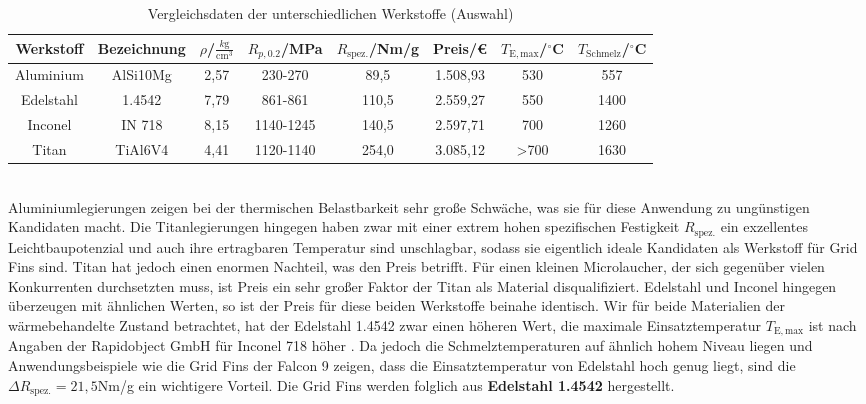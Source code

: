 \begin{table}[h] 
	\centering 
	\begin{tabular}{c|c|c|c|c|c|c|c} 
		Werkstoff&Bezeichnung&$\rho$/$\frac{k\mathrm{g}}{\mathrm{cm}^3}$&$R_{p,0.2}$/MPa&$R_\mathrm{spez.}$/Nm/g&Preis/€&$T_\mathrm{E, max}$/$^\circ$C&$T_\mathrm{Schmelz}$/$^\circ$C\\ 
		\hline 
		Aluminium&AlSi10Mg&2,57&230-270&89,5&1.508,93&530&557\\ 
		Edelstahl&1.4542&7,79&861-861&110,5&2.559,27&550&1400\\ 
		Inconel&IN 718&8,15&1140-1245&140,5&2.597,71&700&1260\\ 
		Titan&TiAl6V4&4,41&1120-1140&254,0&3.085,12&>700&1630\\ 
	\end{tabular} 
	\begin{flushright} 
	\end{flushright} 
	\caption{Vergleichsdaten der unterschiedlichen Werkstoffe (Auswahl)}
	\label{tab_WerkstoffeKlein}
\end{table} \\
Aluminiumlegierungen zeigen bei der thermischen Belastbarkeit sehr große Schwäche, was sie für diese Anwendung zu ungünstigen Kandidaten macht. Die Titanlegierungen hingegen haben zwar mit einer extrem hohen spezifischen Festigkeit $R_\mathrm{spez.}$ ein exzellentes Leichtbaupotenzial und auch ihre ertragbaren Temperatur sind unschlagbar, sodass sie eigentlich ideale Kandidaten als Werkstoff für Grid Fins sind. Titan hat jedoch einen enormen Nachteil, was den Preis betrifft. Für einen kleinen Microlaucher, der sich gegenüber vielen Konkurrenten durchsetzten muss, ist Preis ein sehr großer Faktor der Titan als Material disqualifiziert. Edelstahl und Inconel hingegen überzeugen mit ähnlichen Werten, so ist der Preis für diese beiden Werkstoffe beinahe identisch. Wir für beide Materialien der wärmebehandelte Zustand betrachtet, hat der Edelstahl 1.4542 zwar einen höheren Wert, die maximale Einsatztemperatur $T_\mathrm{E, max}$ ist nach Angaben der Rapidobject GmbH für Inconel 718 höher \cite{preise}. Da jedoch die Schmelztemperaturen auf ähnlich hohem Niveau liegen und Anwendungsbeispiele wie die Grid Fins der Falcon 9 zeigen, dass die Einsatztemperatur von Edelstahl hoch genug liegt, sind die $\Delta R_\mathrm{spez.} = 21,5$Nm/g ein wichtigere Vorteil. Die Grid Fins werden folglich aus \textbf{Edelstahl 1.4542} hergestellt.
